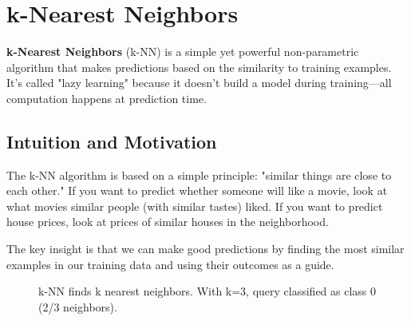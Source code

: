 
\section{k-Nearest Neighbors }
\label{sec:knn}

\textbf{k-Nearest Neighbors} (k-NN) is a simple yet powerful non-parametric algorithm that makes predictions based on the similarity to training examples. It's called "lazy learning" because it doesn't build a model during training—all computation happens at prediction time.

\subsection{Intuition and Motivation}

The k-NN algorithm is based on a simple principle: "similar things are close to each other." If you want to predict whether someone will like a movie, look at what movies similar people (with similar tastes) liked. If you want to predict house prices, look at prices of similar houses in the neighborhood.

The key insight is that we can make good predictions by finding the most similar examples in our training data and using their outcomes as a guide.

\begin{figure}[htbp]
\centering
{}
\caption{k-NN finds k nearest neighbors. With k=3, query classified as class 0 (2/3 neighbors).}
\label{fig:knn-example}
\end{figure}

